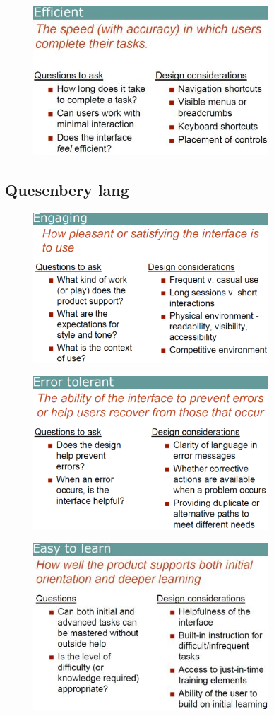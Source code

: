 \documentclass{report}
\begin{document}
\begin{figure}[ht!]
\includegraphics[width=250pt]{efficient.png}
\end{figure}
\newpage
\subsection*{Quesenbery lang}

\begin{figure}[ht!]
\includegraphics[width=250pt]{engaging.png}
\end{figure}

\begin{figure}[ht!]
\includegraphics[width=250pt]{errortolerant.png}
\end{figure}

\begin{figure}[ht!]
\includegraphics[width=250pt]{easytolearn.png}
\end{figure}
\end{document}
